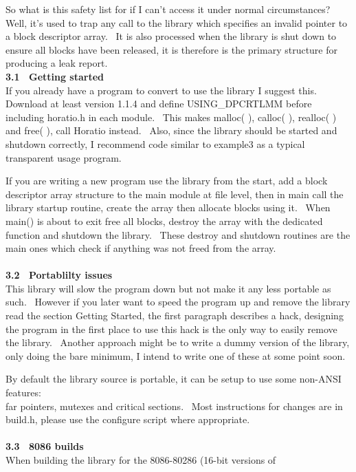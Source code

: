 \documentclass{article}
\begin{document}
\par So what is this safety list for if I can't access it under normal
circumstances?~
Well, it's used to trap any call to the library which specifies an
invalid
pointer to a block descriptor array.~ It is also processed when
the
library is shut down to ensure all blocks have been released, it is
therefore
is the primary structure for producing a leak report.
\\
\textbf{3.1~ Getting started}
\\
If you already have a program to convert to use the library I suggest
this.~ Download at least version 1.1.4 and define USING\_DPCRTLMM
before
including horatio.h in each module.~ This makes malloc( ),
calloc( ), realloc( ) and free( ), call Horatio instead.~ Also,
since the library should
be started and shutdown correctly, I recommend code similar to example3
as a typical transparent usage program.
\par If you are writing a new program use the library from the start, add
a block descriptor array structure to the main module at file level,
then
in main call the library startup routine, create the array then
allocate
blocks using it.~ When main() is about to exit free all blocks,
destroy
the array with the dedicated function and shutdown the library.~
These
destroy and shutdown routines are the main ones which check if anything
was not freed from the array.\\
\\
\textbf{3.2~ Portablilty issues}
\\
This library will slow the program down but not make it any less
portable
as such.~ However if you later want to speed the program up and
remove
the library read the section Getting Started, the first paragraph
describes
a hack, designing the program in the first place to use this hack is
the
only way to easily remove the library.~ Another approach might be
to write a dummy version of the library, only doing the bare minimum, I
intend to write one of these at some point soon.
\par By default the library source is portable, it can be setup to use
some
non-ANSI features:
\\
far pointers, mutexes and critical sections.~
Most instructions for changes are in build.h, please use the configure
script
where appropriate.\\
\\
\textbf{3.3~ 8086 builds}
\\
When building the library for the 8086-80286 (16-bit versions of
\end{document}
